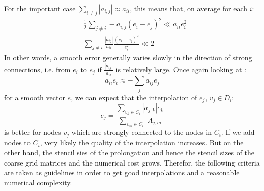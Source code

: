 {  For the important case $\sum_{i\neq j} |a_{i,j}| \approx a_{ii}$, this
  means that, on average for each $i$:
  \begin{align}
    &\frac{1}{2} \sum_{j\neq i} -a_{i,j}(e_i -e_j)^2 \ll a_{ii} e_i^2\\
    &\sum_{j\neq i} \frac{|a_{ij}|}{a_{ii}} \frac{(e_i-e_j)^2}{e_i^2} \ll 2
  \end{align}
  In other words, a smooth error generally varies slowly in the direction of
  strong connections, i.e. from $e_i$ to $e_j$ if $\frac{|a_{ij}|}{a_{ii}}$ is
  relatively large.
  Once again looking at :
  \begin{equation}
    a_{ii} e_i \approx -\sum_j a_{ij} e_j
  \end{equation}
  for a smooth vector $e$, we can expect that the interpolation of $e_j$,
  $v_j\in D_i$:
  \begin{equation}
    e_j = \frac{\sum_{v_k \in C_i} |a_{j,k}| e_k}{\sum_{v_m \in C_i} |A_{j,m}}
  \end{equation}
  is better for nodes $v_j$ which are strongly connected to the nodes in
  $C_i$. If we add nodes to $C_i$, very likely the quality of the
  interpolation increases. But on the other hand, the stencil sies of the
  prolongation and hence the stencil sizes of the coarse grid matrices and the
  numerical cost grows. Therefor, the following criteria are taken as
  guidelines in order to get good interpolations and a reasonable numerical
  complexity.
}
